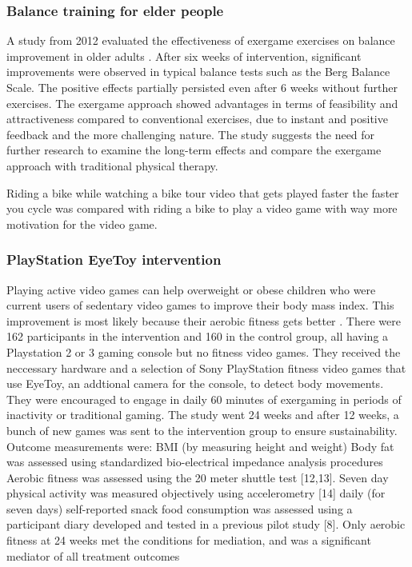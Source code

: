 \subsubsection{Balance training for elder people}
A study from 2012 evaluated the effectiveness of exergame exercises on balance improvement in older adults \cite{lai2013effects}. After six weeks of intervention, significant improvements were observed in typical balance tests such as the Berg Balance Scale. The positive effects partially persisted even after 6 weeks without further exercises. The exergame approach showed advantages in terms of feasibility and attractiveness compared to conventional exercises, due to instant and positive feedback and the more challenging nature. The study suggests the need for further research to examine the long-term effects and compare the exergame approach with traditional physical therapy.

Riding a bike while watching a bike tour video that gets played faster the faster you cycle was compared with riding a bike to play a video game with way more motivation for the video game. \cite{hardy2011adoption}

\subsubsection{PlayStation EyeToy intervention}
Playing active video games can help overweight or obese children who were current users of sedentary video games to improve their body mass index. This improvement is most likely because their aerobic fitness gets better \cite{maddison12avg}. There were 162 participants in the intervention and 160 in the control group, all having a Playstation 2 or 3 gaming console but no fitness video games. They received the neccessary hardware and a selection of Sony PlayStation fitness video games that use EyeToy, an addtional camera for the console, to detect body movements. They were encouraged to engage in daily 60 minutes of exergaming in periods of inactivity or traditional gaming. The study went 24 weeks and after 12 weeks, a bunch of new games was sent to the intervention group to ensure sustainability.
Outcome measurements were:
BMI (by measuring height and weight)
Body fat was assessed using standardized bio-electrical impedance analysis procedures
Aerobic fitness was assessed using the 20 meter shuttle test [12,13].
Seven day physical activity was measured objectively using accelerometry [14]
daily (for seven days) self-reported snack food consumption was assessed using a participant diary developed and tested in a previous pilot study [8].
Only aerobic fitness at 24 weeks met the conditions for mediation, and was a significant mediator of all treatment outcomes

